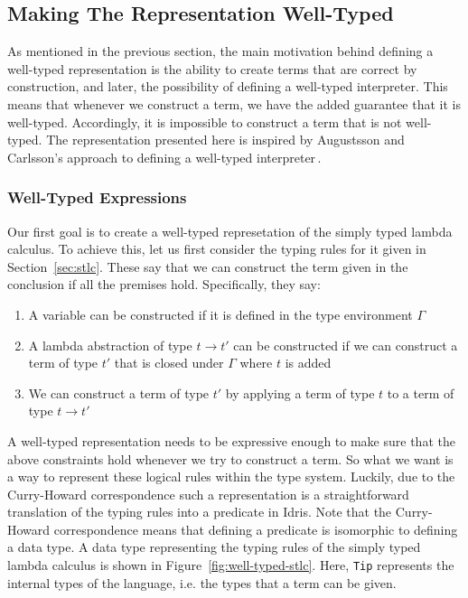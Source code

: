 \subsection{Making The Representation Well-Typed}
As mentioned in the previous section, the main motivation behind defining a well-typed representation is the ability to create terms that are correct by construction, and later, the possibility of defining a well-typed interpreter. This means that whenever we construct a term, we have the added guarantee that it is well-typed. Accordingly, it is impossible to construct a term that is not well-typed. The representation presented here is inspired by Augustsson and Carlsson's approach to defining a well-typed interpreter\,\cite{Augustsson99anexercise}.


\subsubsection{Well-Typed Expressions}


Our first goal is to create a well-typed represetation of the simply typed lambda calculus. To achieve this, let us first consider the typing rules for it given in Section~\ref{sec:stlc}. These say that we can construct the term given in the conclusion if all the premises hold. Specifically, they say:

\begin{enumerate}
\item A variable can be constructed if it is defined in the type environment $\Gamma$
\item A lambda abstraction of type $t \to t'$ can be constructed if we can construct a term of type $t'$ that is closed under $\Gamma$ where $t$ is added
\item We can construct a term of type $t'$ by applying a term of type $t$ to a term of type $t \to t'$ 
\end{enumerate}

A well-typed representation needs to be expressive enough to make sure that the above constraints hold whenever we try to construct a term. So what we want is a way to represent these logical rules within the type system. Luckily, due to the Curry-Howard correspondence such a representation is a straightforward translation of the typing rules into a predicate in Idris. Note that the Curry-Howard correspondence means that defining a predicate is isomorphic to defining a data type. A data type representing the typing rules of the simply typed lambda calculus is shown in Figure~\ref{fig:well-typed-stlc}. Here, \texttt{Tip} represents the internal types of the language, i.e. the types that a term can be given.

